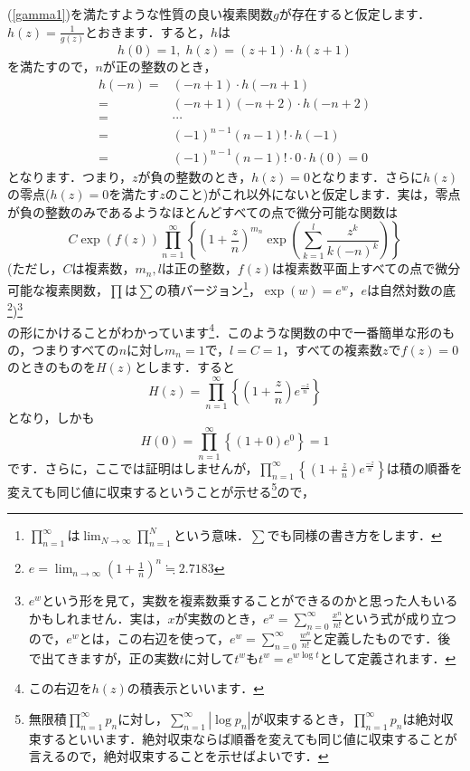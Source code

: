\documentclass[./main]{subfile}
\begin{document}
(\ref{gamma1})を満たすような性質の良い複素関数$g$が存在すると仮定します．$h(z)=\frac{1}{g(z)}$とおきます．すると，$h$は
\begin{equation}\label{invg}
h(0)=1,\;h(z)=(z+1)\cdot h(z+1)
\end{equation}
を満たすので，$n$が正の整数のとき，
\begin{align*}
h(-n)=&(-n+1)\cdot h(-n+1)\\
=&(-n+1)(-n+2)\cdot h(-n+2)\\
=&\cdots\\
=&(-1)^{n-1}(n-1)!\cdot h(-1)\\
=&(-1)^{n-1}(n-1)!\cdot0\cdot h(0)=0
\end{align*}
となります．つまり，$z$が負の整数のとき，$h(z)=0$となります．さらに$h(z)$の零点($h(z)=0$を満たす$z$のこと)がこれ以外にないと仮定します．実は，零点が負の整数のみであるようなほとんどすべての点で微分可能な関数は
\[
C\exp(f(z))\prod_{n=1}^{\infty}\left\{\left(1+\frac{z}{n}\right)^{m_n}\exp\left(\sum_{k=1}^l\frac{z^k}{k(-n)^k}\right)\right\}
\]
(ただし，$C$は複素数，$m_n,l$は正の整数，$f(z)$は複素数平面上すべての点で微分可能な複素関数，$\prod$は$\sum$の積バージョン\footnote{$\prod_{n=1}^{\infty}$は$\lim_{N\to\infty}\prod_{n=1}^N$という意味．$\sum$でも同様の書き方をします．}，$\exp(w)=e^w$，$e$は自然対数の底\footnote{$e=\lim_{n\to\infty}\left(1+\frac{1}{n}\right)^n\fallingdotseq 2.7183$})\footnote{$e^w$という形を見て，実数を複素数乗することができるのかと思った人もいるかもしれません．実は，$x$が実数のとき，$e^x=\sum_{n=0}^{\infty}\frac{x^n}{n!}$という式が成り立つので，$e^w$とは，この右辺を使って，$e^w=\sum_{n=0}^{\infty}\frac{w^n}{n!}$と定義したものです．後で出てきますが，正の実数$t$に対して$t^w$も$t^w=e^{w\log t}$として定義されます．}\\
の形にかけることがわかっています\footnote{この右辺を$h(z)$の積表示といいます．}．このような関数の中で一番簡単な形のもの，つまりすべての$n$に対し$m_n=1$で，$l=C=1$，すべての複素数$z$で$f(z)=0$のときのものを$H(z)$とします．すると
\[
H(z)=\prod_{n=1}^{\infty}\left\{\left(1+\frac{z}{n}\right)e^{\frac{-z}{n}}\right\}
\]
となり，しかも
\[
H(0)=\prod_{n=1}^{\infty}\left\{(1+0)e^0\right\}=1
\]
です．さらに，ここでは証明はしませんが，$\prod_{n=1}^{\infty}\left\{\left(1+\frac{z}{n}\right)e^{\frac{-z}{n}}\right\}$は積の順番を変えても同じ値に収束するということが示せる\footnote{無限積$\prod_{n=1}^{\infty}p_n$に対し，$\sum_{n=1}^{\infty}|\log p_n|$が収束するとき，$\prod_{n=1}^{\infty}p_n$は絶対収束するといいます．絶対収束ならば順番を変えても同じ値に収束することが言えるので，絶対収束することを示せばよいです．}ので，
\end{document}

